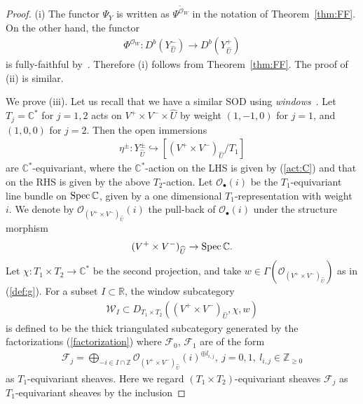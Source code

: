 \documentclass[11pt]{amsart}
\theoremstyle{plain}
\newcommand{\fF}{\mathcal{F}}
\newcommand{\oO}{\mathcal{O}}
\newcommand{\wW}{\mathcal{W}}
\newcommand{\Spec}{\mathop{\rm Spec}\nolimits}
\begin{document}
\begin{proof}
(i) The functor $\Psi_Y$ is written as
$\Psi^{\widetilde{\oO}_W}$ 
in the notation of Theorem~\ref{thm:FF}. 
On the other hand, the 
functor 
\begin{align}\label{funct:PhiW}
\Phi^{\oO_W} \colon D^b(Y_{\widehat{U}}^-) \to D^b(Y_{\widehat{U}}^+)
\end{align}
is fully-faithful by~\cite{B-O2}. 
Therefore (i) follows from Theorem~\ref{thm:FF}.
The proof of (ii) is similar. 

We prove (iii). 
Let us recall that we 
have a similar SOD 
using \textit{windows}~\cite{MR3327537, BFK2}. 
Let $T_j=\mathbb{C}^{\ast}$ for $j=1, 2$
acts on $V^+ \times V^- \times \widehat{U}$ by 
weight $(1, -1, 0)$ for $j=1$, 
and $(1, 0, 0)$ for $j=2$. 
Then the open immersions
\begin{align}\label{eta:open}
\eta^{\pm} \colon Y_{\widehat{U}}^{\pm} \hookrightarrow 
[(V^+ \times V^-)_{\widehat{U}}/T_1]
\end{align}
are $\mathbb{C}^{\ast}$-equivariant, where 
the $\mathbb{C}^{\ast}$-action on the LHS 
is given by (\ref{act:C}) and 
that on the RHS is given by the 
above $T_2$-action. 
Let $\oO_{\bullet}(i)$ be the 
$T_1$-equivariant line bundle on 
$\Spec \mathbb{C}$, 
given by a one dimensional $T_1$-representation  
with weight $i$. 
We denote by $\oO_{(V^+ \times V^-)_{\widehat{U}}}(i)$
the pull-back of $\oO_{\bullet}(i)$ under the 
structure morphism 
\begin{align*}
(V^+ \times V^-)_{\widehat{U}} \to \Spec \mathbb{C}.
\end{align*}
Let $\chi \colon T_1 \times T_2 \to \mathbb{C}^{\ast}$
be the second projection, and take
$w \in \Gamma(\oO_{(V^+ \times V^-)_{\widehat{U}}})$ as in (\ref{def:g}). 
For a subset $I \subset \mathbb{R}$, 
the window subcategory 
\begin{align}\label{window}
\wW_I \subset D_{T_1 \times T_2}((V^+ \times V^-)_{\widehat{U}}, \chi ,w)
\end{align}
is defined 
to be 
the thick triangulated subcategory generated by 
the factorizations (\ref{factorization}) 
where $\fF_0$, $\fF_1$ are of the form
\begin{align*}
\fF_j=\bigoplus_{-i \in I \cap \mathbb{Z}} 
\oO_{(V^+ \times V^-)_{\widehat{U}}}(i)^{\oplus l_{i, j}}, \ j=0, 1, \ 
l_{i, j} \in \mathbb{Z}_{\ge 0}
\end{align*}
as $T_1$-equivariant sheaves.
Here we regard $(T_1 \times T_2)$-equivariant 
sheaves $\fF_j$ as $T_1$-equivariant 
sheaves by the inclusion 

\end{proof}
\end{document}
